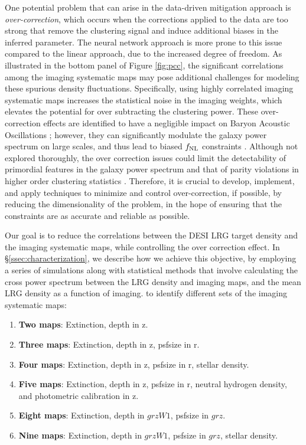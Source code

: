 One potential problem that can arise in the data-driven mitigation approach is \textit{over-correction}, which occurs when the corrections applied to the data are too strong that remove the clustering signal and induce additional biases in the inferred parameter. The neural network approach is more prone to this issue compared to the linear approach, due to the increased degree of freedom. As illustrated in the bottom panel of Figure \ref{fig:pcc}, the significant correlations among the imaging systematic maps may pose additional challenges for modeling these spurious density fluctuations. Specifically, using highly correlated imaging systematic maps increases the statistical noise in the imaging weights, which elevates the potential for over subtracting the clustering power. These over-correction effects are identified to have a negligible impact on Baryon Acoustic Oscillations \citep{merz2021clustering}; however, they can significantly modulate the galaxy power spectrum on large scales, and thus lead to biased $f_{\rm NL}$ constraints \citep{rezaie2021primordial, mueller2022primordial}. Although not explored thoroughly, the over correction issues could limit the detectability of primordial features in the galaxy power spectrum and that of parity violations in higher order clustering statistics \citep{beutler2019primordial, cahn2021test, philcox2022probing}. Therefore, it is crucial to develop, implement, and apply techniques to minimize and control over-correction, if possible, by reducing the dimensionality of the problem, in the hope of ensuring that the constraints are as accurate and reliable as possible. 

Our goal is to reduce the correlations between the DESI LRG target density and the imaging systematic maps, while controlling the over correction effect.  In \S \ref{ssec:characterization}, we describe how we achieve this objective, by employing a series of simulations along with statistical methods that involve calculating the cross power spectrum between the LRG density and imaging maps, and the mean LRG density as a function of imaging. to identify different sets of the imaging systematic maps:
\begin{enumerate}[itemindent=*]
\item \textbf{Two maps}: Extinction, depth in z.
\item \textbf{Three maps}: Extinction, depth in z, psfsize in r.
\item \textbf{Four maps}: Extinction, depth in z, psfsize in r, stellar density.
\item \textbf{Five maps}: Extinction, depth in z, psfsize in r, neutral hydrogen density, and photometric calibration in z.
\item \textbf{Eight maps}: Extinction, depth in $grzW1$, psfsize in $grz$.
\item \textbf{Nine maps}: Extinction, depth in $grzW1$, psfsize in $grz$, stellar density.
\end{enumerate}

